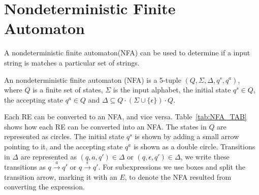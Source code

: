 \section{Nondeterministic Finite Automaton}\label{RA_TO_NFA}
A nondeterministic finite automaton(NFA) can be used to determine if a input string is matches a particular set of strings.
\begin{mydef}
An nondeterministic finite automaton (NFA) is a 5-tuple $(Q,\Sigma,\Delta,q^s ,q^a)$, where $Q$ is a finite set of states, $\Sigma$ is the input alphabet, the initial state $q^s \in Q$,  the accepting state $q^a \in Q$ and $\Delta \subseteq Q \cdot (\Sigma \cup \{\epsilon\}) \cdot Q$. 
\end{mydef}
Each RE can be converted to an NFA, and vice versa. Table~\ref{tab:NFA_TAB} shows how each RE can be converted into an NFA. The states in $Q$ are represented as circles. The initial state $q^s$ is shown by adding a small arrow pointing to it, and the accepting state $q^a$ is shown as a double circle. Transitions in $\Delta$ are represented as  $(q,a,q')\in \Delta$ or $(q,\epsilon ,q')\in\Delta$, we write these transitions as $q \xrightarrow{a} q'$ or $q \xrightarrow{\epsilon} q'$. For subexpressions we use boxes and split the transition arrow, marking it with an $E$, to denote the NFA resulted from converting the expression. 

